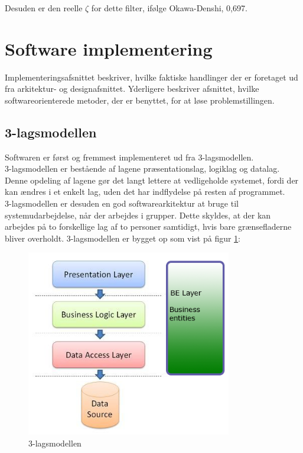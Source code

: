 Desuden er den reelle $\zeta$ for dette filter, ifølge Okawa-Denshi, 0,697.


\section{Software implementering}\label{implementering}
Implementeringsafsnittet beskriver, hvilke faktiske handlinger der er foretaget ud fra arkitektur- og designafsnittet. Yderligere beskriver afsnittet, hvilke softwareorienterede metoder, der er benyttet, for at løse problemstillingen.

\subsection{3-lagsmodellen}
Softwaren er først og fremmest implementeret ud fra 3-lagsmodellen.\\
3-lagsmodellen er bestående af lagene præsentationslag, logiklag og datalag.
Denne opdeling af lagene gør det langt lettere at vedligeholde systemet, fordi der kan ændres i et enkelt lag, uden det har indflydelse på resten af programmet. \\
3-lagsmodellen er desuden en god softwarearkitektur at bruge til  systemudarbejdelse, når der arbejdes i grupper. Dette skyldes, at der kan arbejdes på to forskellige lag af to personer samtidigt, hvis bare grænsefladerne bliver overholdt. 3-lagsmodellen er bygget op som vist på figur \ref{3lag}:

\begin{figure}[H]
	\centering
	\includegraphics[width=0.8\textwidth]{Figurer/SoftwareImplementering/3lag}
	\caption{3-lagsmodellen}
	\label{3lag}
\end{figure}

